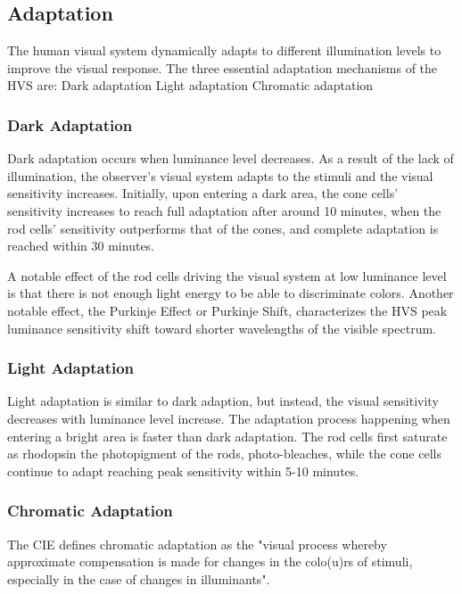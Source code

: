 \subsection{Adaptation}
\label{subsec:adaptation}

The human visual system dynamically adapts to different illumination levels to improve the visual response. The three essential adaptation mechanisms of the HVS are:
Dark adaptation
Light adaptation
Chromatic adaptation

\subsubsection{Dark Adaptation}
\label{subsubsec:dark-adaptation}

Dark adaptation occurs when luminance level decreases. As a result of the lack of illumination, the observer’s visual system adapts to the stimuli and the visual sensitivity increases. Initially, upon entering a dark area, the cone cells’ sensitivity increases to reach full adaptation after around 10 minutes, when the rod cells’ sensitivity outperforms that of the cones, and complete adaptation is reached within 30 minutes.

A notable effect of the rod cells driving the visual system at low luminance level is that there is not enough light energy to be able to discriminate colors. Another notable effect,  the Purkinje Effect or Purkinje Shift, characterizes the HVS peak luminance sensitivity shift toward shorter wavelengths of the visible spectrum.

\subsubsection{Light Adaptation}
\label{subsubsec:light-adaptation}

Light adaptation is similar to dark adaption, but instead, the visual sensitivity decreases with luminance level increase. The adaptation process happening when entering a bright area is faster than dark adaptation. The rod cells first saturate as rhodopsin the photopigment of the rods, photo-bleaches, while the cone cells continue to adapt reaching peak sensitivity within 5-10 minutes.

\subsubsection{Chromatic Adaptation}
\label{subsubsec:chromatic-adaptation}

The CIE defines chromatic adaptation as the "visual process whereby approximate compensation is made for changes in the colo(u)rs of stimuli, especially in the case of changes in illuminants".

